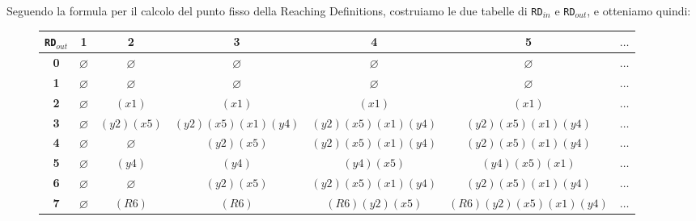     Seguendo la formula per il calcolo del punto fisso della Reaching Definitions, 
    costruiamo le due tabelle di \texttt{RD}$_{in}$ e \texttt{RD}$_{out}$,
    e otteniamo quindi:

    \begin{figure}[H]
        \centering
        \begin{tabular}{|c|c|c|c|c|c|c|}
            \hline
            \texttt{RD}$_{out}$& \textbf{1} & \textbf{2} & \textbf{3} & \textbf{4} & \textbf{5}& \textbf{$\dots$} \\
            \hline 
            \textbf{0} & $\varnothing$ & $\varnothing$ & $\varnothing$ & $\varnothing$  & $\varnothing$ & $\dots$ \\
            \hline
            \textbf{1} & $\varnothing$ & $\varnothing$ & $\varnothing$ & $\varnothing$  & $\varnothing$ & $\dots$ \\
            \hline
            \textbf{2} & $\varnothing$ & $(x1)$ & $(x1)$ 
            & $(x1)$  & $(x1)$& $\dots$ \\
            \hline
            \textbf{3} & $\varnothing$ &$(y2)(x5)$ & $(y2)(x5)(x1)(y4)$ &
            $(y2)(x5)(x1)(y4)$ & $(y2)(x5)(x1)(y4)$ & $\dots$ \\
            \hline
            \textbf{4} & $\varnothing$ & $\varnothing$ & $(y2)(x5)$  
            & $(y2)(x5)(x1)(y4)$ & $(y2)(x5)(x1)(y4)$ & $\dots$ \\
            \hline
            \textbf{5} & $\varnothing$  & $(y4)$ & $(y4)$ 
            & $(y4)(x5)$ & $(y4)(x5)(x1)$ & $\dots$ \\
            \hline
            \textbf{6} & $\varnothing$  & $\varnothing$ & $(y2)(x5)$ 
            & $(y2)(x5)(x1)(y4)$ & $(y2)(x5)(x1)(y4)$ & $\dots$ \\
            \hline
            \textbf{7} & $\varnothing$  & $(R6)$ & $(R6)$ & $(R6)(y2)(x5)$ & $(R6)(y2)(x5)(x1)(y4)$& $\dots$ \\
            \hline
        \end{tabular}
    \end{figure}

